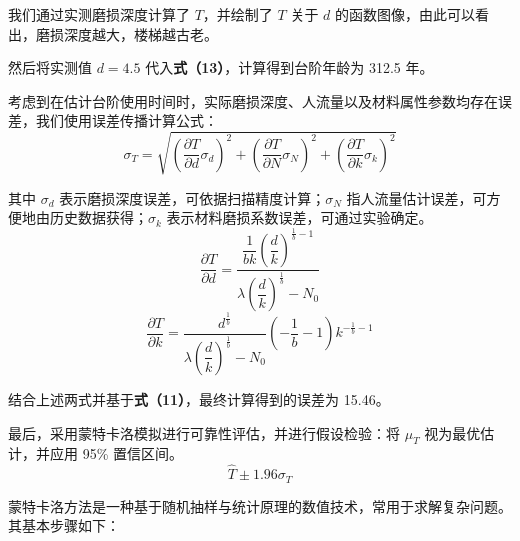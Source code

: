 \documentclass[11pt,a4paper]{ctexart}
\begin{document}
我们通过实测磨损深度计算了 $T$，并绘制了 $T$ 关于 $d$ 的函数图像，由此可以看出，磨损深度越大，楼梯越古老。

然后将实测值 $d=4.5$ 代入\textbf{式（13）}，计算得到台阶年龄为 312.5 年。

考虑到在估计台阶使用时间时，实际磨损深度、人流量以及材料属性参数均存在误差，我们使用误差传播计算公式：
\begin{equation}
\sigma_T=\sqrt{\left(\frac{\partial T}{\partial d}\sigma_d\right)^2+\left(\frac{\partial T}{\partial N}\sigma_N\right)^2+\left(\frac{\partial T}{\partial k}\sigma_k\right)^2}\tag{14}
\end{equation}

其中 $\sigma_d$ 表示磨损深度误差，可依据扫描精度计算；$\sigma_N$ 指人流量估计误差，可方便地由历史数据获得；$\sigma_k$ 表示材料磨损系数误差，可通过实验确定。
\begin{equation}
\frac{\partial T}{\partial d}=\frac{\dfrac{1}{bk}\left(\dfrac{d}{k}\right)^{\frac{1}{b}-1}}{\lambda\left(\dfrac{d}{k}\right)^{\frac{1}{b}}-N_0}\tag{15}
\end{equation}
\begin{equation}
\frac{\partial T}{\partial k}=\frac{d^{\frac{1}{b}}}{\lambda\left(\dfrac{d}{k}\right)^{\frac{1}{b}}-N_0}\left(-\frac{1}{b}-1\right)k^{-\frac{1}{b}-1}\tag{16}
\end{equation}

结合上述两式并基于\textbf{式（11）}，最终计算得到的误差为 15.46。

最后，采用蒙特卡洛模拟进行可靠性评估，并进行假设检验：将 $\mu_T$ 视为最优估计，并应用 95\% 置信区间。
\begin{equation}
\hat T\pm 1.96\sigma_T\tag{17}
\end{equation}

蒙特卡洛方法是一种基于随机抽样与统计原理的数值技术，常用于求解复杂问题。其基本步骤如下：
\end{document}

